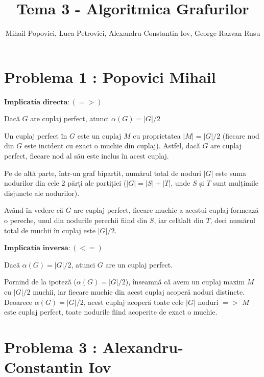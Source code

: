\documentclass{article}
\title{Tema 3 - Algoritmica Grafurilor}
\author{Mihail Popovici, Luca Petrovici, Alexandru-Constantin Iov, George-Razvan Rusu}
\begin{document}
\maketitle

\section*{\fontsize{20}{50}\selectfont Problema 1 : Popovici Mihail}

{\fontsize{14}{16}\selectfont 
$\mathbf{Implicatia}$ $\mathbf{directa: (=>)}$ 
\par Dacă $G$ are cuplaj perfect, atunci $\alpha(G) = |G|/2$
\\
\par Un cuplaj perfect în $G$ este un cuplaj $M$ cu proprietatea $|M| = |G|/2$ (fiecare nod din $G$ este incident cu exact o muchie din cuplaj). Astfel, dacă $G$ are cuplaj perfect, fiecare nod al său este inclus în acest cuplaj. 
\par Pe de altă parte, într-un graf bipartit, numărul total de noduri $|G|$ este suma nodurilor din cele 2 părți ale partiției ($|G| = |S| + |T|$, unde $S$ și $T$ sunt mulțimile disjuncte ale nodurilor).
\par Având în vedere că $G$ are cuplaj perfect, fiecare muchie a acestui cuplaj formează o pereche, unul din nodurile perechii fiind din $S$, iar celălalt din $T$, deci numărul total de muchii în cuplaj este $|G|/2$.

\bigskip
$\mathbf{Implicatia}$ $\mathbf{inversa: (<=)}$ 
\par Dacă $\alpha(G) = |G|/2$, atunci $G$ are un cuplaj perfect.
\\

\par Pornind de la ipoteză ($\alpha(G) = |G|/2$), înseamnă că avem un cuplaj maxim $M$ cu $|G|/2$ muchii, iar fiecare muchie din acest cuplaj acoperă noduri distincte. Deoarece $\alpha(G) = |G|/2$, acest cuplaj acoperă toate cele $|G|$ noduri $=>$ $M$ este cuplaj perfect, toate nodurile fiind acoperite de exact o muchie. 

}

\section*{\fontsize{20}{50}\selectfont Problema 3 : Alexandru-Constantin Iov}
\end{document}
